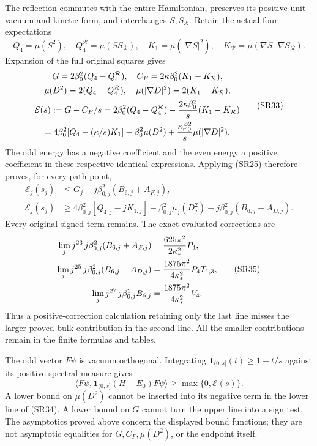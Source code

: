 \documentclass[11pt]{article}
\begin{document}
The reflection commutes with the entire Hamiltonian, preserves its positive unit vacuum and kinetic form, and interchanges \(S,S_{\mathcal R}\). Retain the actual four expectations
\[
Q_4=\mu(S^2),\quad Q_4^{\mathcal R}=\mu(SS_{\mathcal R}),\quad
K_1=\mu(|\nabla S|^2),\quad K_{\mathcal R}=\mu(\nabla S\cdot\nabla S_{\mathcal R}).
\tag{SR32}
\]
Expansion of the full original squares gives
\[
\begin{gathered}
G=2\beta_0^2(Q_4-Q_4^{\mathcal R}),\quad
C_F=2\kappa\beta_0^2(K_1-K_{\mathcal R}),\\
\mu(D^2)=2(Q_4+Q_4^{\mathcal R}),\quad
\mu(|\nabla D|^2)=2(K_1+K_{\mathcal R}),\\
\mathcal E(s):=G-C_F/s
=2\beta_0^2(Q_4-Q_4^{\mathcal R})-{2\kappa\beta_0^2\over s}(K_1-K_{\mathcal R})\\
=4\beta_0^2[Q_4-(\kappa/s)K_1]-\beta_0^2\mu(D^2)
+{\kappa\beta_0^2\over s}\mu(|\nabla D|^2).
\end{gathered}\tag{SR33}
\]
The odd energy has a negative coefficient and the even energy a positive coefficient in these respective identical expressions. Applying (SR25) therefore proves, for every path point,
\[
\boxed{\begin{aligned}
\mathcal E_j(s_j)&\le G_j-j\beta_{0,j}^2(B_{6,j}+A_{F,j}),\\
\mathcal E_j(s_j)&\ge4\beta_{0,j}^2[Q_{4,j}-jK_{1,j}]
-\beta_{0,j}^2\mu_j(D_j^2)+j\beta_{0,j}^2(B_{6,j}+A_{D,j}).
\end{aligned}}\tag{SR34}
\]
Every original signed term remains. The exact evaluated corrections are
\[
\begin{aligned}
\lim_j j^{23}\,j\beta_{0,j}^2(B_{6,j}+A_{F,j})
&={625\pi^2\over2\kappa_*^2}P_4,\\
\lim_j j^{25}\,j\beta_{0,j}^2(B_{6,j}+A_{D,j})
&={1875\pi^2\over4\kappa_*^2}P_4T_{1,3},\\
\lim_j j^{27}\,j\beta_{0,j}^2B_{6,j}
&={1875\pi^2\over4\kappa_*^2}V_4.
\end{aligned}\tag{SR35}
\]
Thus a positive-correction calculation retaining only the last line misses the larger proved bulk contribution in the second line. All the smaller contributions remain in the finite formulas and tables.

The odd vector \(F\psi\) is vacuum orthogonal. Integrating \(\mathbf1_{(0,s]}(t)\ge1-t/s\) against its positive spectral measure gives
\[
\langle F\psi,\mathbf1_{(0,s]}(H-E_0)F\psi\rangle\ge\max\{0,\mathcal E(s)\}.
\tag{SR36}
\]
A lower bound on \(\mu(D^2)\) cannot be inserted into its negative term in the lower line of (SR34). A lower bound on \(G\) cannot turn the upper line into a sign test. The asymptotics proved above concern the displayed bound functions; they are not asymptotic equalities for \(G,C_F,\mu(D^2)\), or the endpoint itself.
\end{document}
